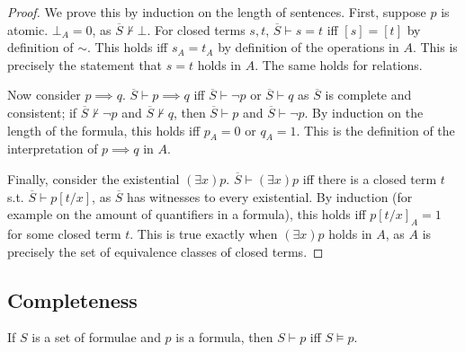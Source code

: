 \begin{proof}
    We prove this by induction on the length of sentences.
    First, suppose $p$ is atomic.
    $\bot_A = 0$, as $\overline S \not\vdash \bot$.
    For closed terms $s, t$, $\overline S \vdash s = t$ iff $[s] = [t]$ by definition of $\sim$.
    This holds iff $s_A = t_A$ by definition of the operations in $A$.
    This is precisely the statement that $s = t$ holds in $A$.
    The same holds for relations.

    Now consider $p \implies q$.
    $\overline S \vdash p \implies q$ iff $\overline S \vdash \neg p$ or $\overline S \vdash q$ as $\overline S$ is complete and consistent; if $\overline S \not\vdash \neg p$ and $\overline S \not\vdash q$, then $\overline S \vdash p$ and $\overline S \vdash \neg p$.
    By induction on the length of the formula, this holds iff $p_A = 0$ or $q_A = 1$.
    This is the definition of the interpretation of $p \implies q$ in $A$.

    Finally, consider the existential $(\exists x)p$.
    $\overline S \vdash (\exists x)p$ iff there is a closed term $t$ s.t. $\overline S \vdash p[t/x]$, as $\overline S$ has witnesses to every existential.
    By induction (for example on the amount of quantifiers in a formula), this holds iff $p[t/x]_A = 1$ for some closed term $t$.
    This is true exactly when $(\exists x)p$ holds in $A$, as $A$ is precisely the set of equivalence classes of closed terms.
\end{proof}

\subsection{Completeness}
\begin{theorem}
    If $S$ is a set of formulae and $p$ is a formula, then $S \vdash p$ iff $S \models p$.
\end{theorem}

